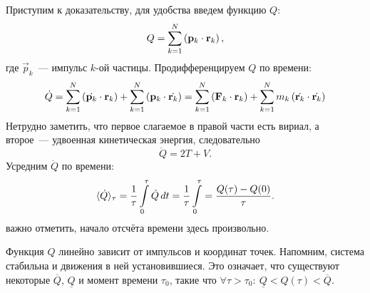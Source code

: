 Приступим к доказательству, 
для удобства введем функцию $Q$:
\begin{equation*}
    Q = \sum_{k=1}^N \left(\mathbf{p}_k \cdot \mathbf{r}_k \right),
\end{equation*}
где $\vec p_k$~--- импульс $k$-ой частицы. Продифференцируем $Q$ по времени:
\begin{equation*}
    \dot Q
    = \sum_{k=1}^N \left(\dot{\mathbf{p}_k} \cdot \mathbf{r}_k \right) 
    + \sum_{k=1}^N \left(\mathbf{p}_k \cdot \dot{\mathbf{r}_k} \right) 
    = \sum_{k=1}^N \left(\mathbf{F}_k \cdot \mathbf{r}_k \right) 
    + \sum_{k=1}^N m_k \left(\dot{\mathbf{r}_k} \cdot \dot{\mathbf{r}_k} \right)
\end{equation*}
Нетрудно заметить, что первое слагаемое в правой части есть вириал, а второе~--- удвоенная кинетическая энергия, следовательно
\begin{equation}
    \dot{Q} = 2T + V.
    \label{eq:virial-2tv}
\end{equation}
Усредним $\dot{Q}$ по времени:
\begin{equation}
    \langle \dot{Q} \rangle_\tau 
    = \frac{1}{\tau} \int\limits_0^\tau \dot{Q} \,d t 
    = \frac{1}{\tau} \int\limits_0^\tau 
    = \frac{Q(\tau) - Q(0)}{\tau}.
\label{eq:virial-avg-g}
\end{equation} 
важно отметить, начало отсчёта времени здесь произвольно.

Функция $Q$ линейно зависит от импульсов и координат точек. Напомним, система стабильна и движения в ней установившиеся. Это означает, что существуют некоторые $\overline Q$, $\underline Q$ и  момент времени $\tau_0$, такие что $\forall \tau > \tau_0:~\underline Q < Q(\tau) < \overline Q$.

